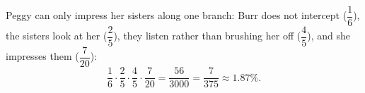 Peggy can only impress her sisters along one branch: Burr does not intercept ($\dfrac16$), the sisters look at her ($\dfrac25$), they listen rather than brushing her off ($\dfrac45$), and she impresses them ($\dfrac7{20}$):
\[\dfrac16\cdot\dfrac25\cdot\dfrac45\cdot\dfrac{7}{20}=\dfrac{56}{3000}=\boxed{\dfrac{7}{375}}\approx1.87\%.\]
